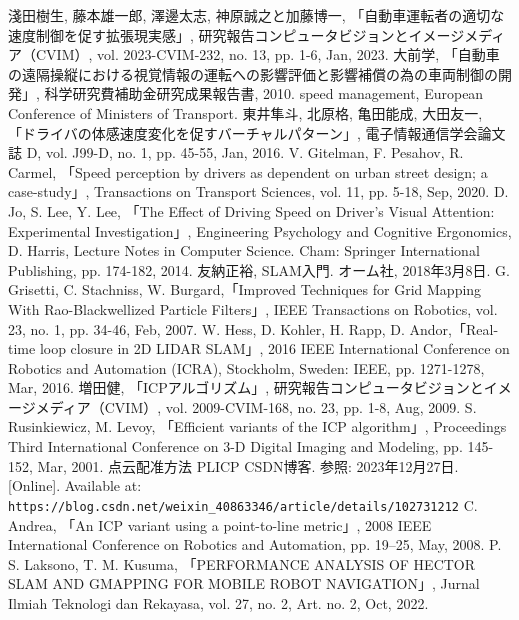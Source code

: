 \documentclass[a4paper,12pt]{jreport}
\renewcommand{\bibname}{参考文献}
\begin{document}
\begin{thebibliography}{99}
  \addcontentsline{toc}{chapter}{\bibname}
   淺田樹生, 藤本雄一郎, 澤邊太志, 神原誠之と加藤博一, 「自動車運転者の適切な速度制御を促す拡張現実感」, 研究報告コンピュータビジョンとイメージメディア（CVIM）, vol. 2023-CVIM-232, no. 13, pp. 1-6, Jan, 2023.
   大前学, 「自動車の遠隔操縦における視覚情報の運転への影響評価と影響補償の為の車両制御の開発」, 科学研究費補助金研究成果報告書, 2010.
   speed management, European Conference of Ministers of Transport.
   東井隼斗, 北原格, 亀田能成, 大田友一, 「ドライバの体感速度変化を促すバーチャルパターン」, 電子情報通信学会論文誌 D, vol. J99-D, no. 1, pp. 45-55, Jan, 2016.
   V. Gitelman, F. Pesahov, R. Carmel, 「Speed perception by drivers as dependent on urban street design; a case-study」, Transactions on Transport Sciences, vol. 11, pp. 5-18, Sep, 2020.
  D. Jo, S. Lee, Y. Lee, 「The Effect of Driving Speed on Driver's Visual Attention: Experimental Investigation」, Engineering Psychology and Cognitive Ergonomics, D. Harris, Lecture Notes in Computer Science. Cham: Springer International Publishing, pp. 174-182, 2014.
  友納正裕, SLAM入門. オーム社, 2018年3月8日.
  G. Grisetti, C. Stachniss, W. Burgard,「Improved Techniques for Grid Mapping With Rao-Blackwellized Particle Filters」, IEEE Transactions on Robotics, vol. 23, no. 1, pp. 34-46, Feb, 2007.
  W. Hess, D. Kohler, H. Rapp, D. Andor,「Real-time loop closure in 2D LIDAR SLAM」, 2016 IEEE International Conference on Robotics and Automation (ICRA), Stockholm, Sweden: IEEE, pp. 1271-1278, Mar, 2016.
  増田健, 「ICPアルゴリズム」, 研究報告コンピュータビジョンとイメージメディア（CVIM）, vol. 2009-CVIM-168, no. 23, pp. 1-8, Aug, 2009.
  S. Rusinkiewicz, M. Levoy, 「Efficient variants of the ICP algorithm」, Proceedings Third International Conference on 3-D Digital Imaging and Modeling, pp. 145-152, Mar, 2001.
  点云配准方法 PLICP CSDN博客. 参照: 2023年12月27日. [Online]. Available at: \verb|https://blog.csdn.net/weixin_40863346/article/details/102731212|
  C. Andrea, 「An ICP variant using a point-to-line metric」, 2008 IEEE International Conference on Robotics and Automation, pp. 19–25, May, 2008.
  P. S. Laksono, T. M. Kusuma, 「PERFORMANCE ANALYSIS OF HECTOR SLAM AND GMAPPING FOR MOBILE ROBOT NAVIGATION」, Jurnal Ilmiah Teknologi dan Rekayasa, vol. 27, no. 2, Art. no. 2, Oct, 2022.

\end{thebibliography}
\end{document}
